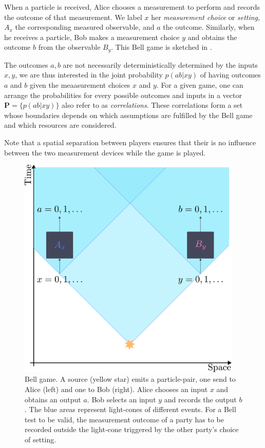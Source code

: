 When a particle is received, Alice chooses a measurement to perform and records the outcome of that measurement.
We label $x$ her \textit{measurement choice} or \textit{setting}, $A_x$ the corresponding measured observable, and $a$ the outcome.
Similarly, when he receives a particle, Bob makes a measurement choice $y$ and obtains the outcome $b$ from the observable $B_y$.
This Bell game is sketched in .

The outcomes $a,b$ are not necessarily deterministically determined by the inputs $x,y$, we are thus interested in the joint probability $p(ab|xy)$ of having outcomes $a$ and $b$ given the meaasurement choices $x$ and $y$. 
For a given game, one can arrange the probabilities for every possible outcomes and inputs in a vector $\mathbf{P}=\{ p(ab|xy)\}$ also refer to as \textit{correlations}.
These correlations form a set whose boundaries depends on which assumptions are fulfilled by the Bell game and which resources are considered.

Note that a spatial separation between players ensures that their is no influence between the two measurement devices while the game is played.

\begin{figure}
	\begin{center}
		\includegraphics[width=0.95\textwidth]{chapters/overview/img/belltest.pdf}
	\end{center}
	\caption{Bell game. A source (yellow star) emits a particle-pair, one send to Alice (left) and one to Bob (right). Alice chooses an input $x$ and obtains an output $a$. Bob selects an input $y$ and records the output $b$. The blue areas represent light-cones of different events. For a Bell test to be valid, the measurement outcome of a party has to be recorded outside the light-cone triggered by the other party's choice of setting. }
	\label{fig:belltest}
\end{figure}



